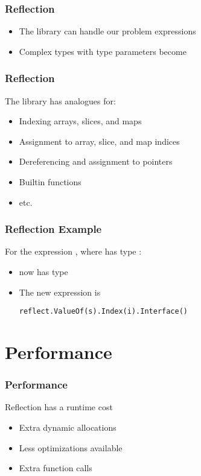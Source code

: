 \documentclass[12pt]{beamer}
\begin{document}

\begin{frame}[fragile]
\frametitle{Reflection}
\begin{itemize}
\item The  library can handle our problem expressions
\item Complex types with type parameters become 
\end{itemize}
\end{frame}


\begin{frame}[fragile]
\frametitle{Reflection}
The  library has analogues for:
\begin{itemize}
\item Indexing arrays, slices, and maps
\item Assignment to array, slice, and map indices
\item Dereferencing and assignment to pointers
\item Builtin functions
\item etc.
\end{itemize}
\end{frame}


\begin{frame}[fragile]
\frametitle{Reflection Example}
For the expression , where  has type :
\begin{itemize}
\item {} now has type 
\item The new expression is
\begin{verbatim}
reflect.ValueOf(s).Index(i).Interface()
\end{verbatim}
\end{itemize}
\end{frame}

\section{Performance}

\begin{frame}[fragile]
\frametitle{Performance}
Reflection has a runtime cost
\begin{itemize}
\item Extra dynamic allocations
\item Less optimizations available
\item Extra function calls
\end{itemize}
\end{frame}
\end{document}
